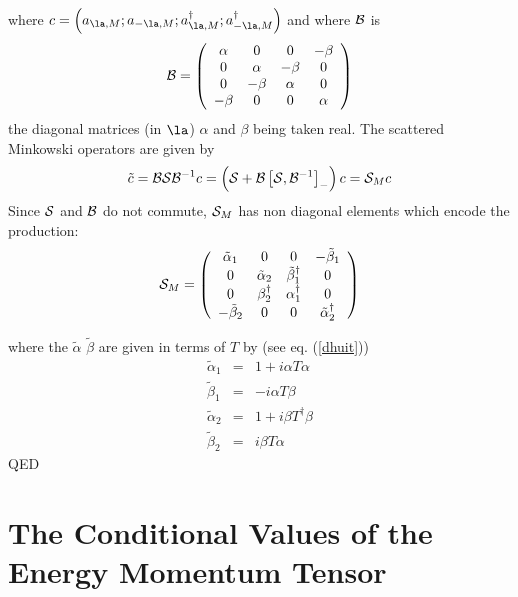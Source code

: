 where $c=  \left( a_{\la,M};a_{- \la,M};a_{\la,M}^\dagger;a_{- \la,M}^\dagger
\right)$
 and where $ {\cal  B}$ is
\begin{equation}
  {\cal  B} =
\left( \begin{array}{cccc}
 \alpha &  0 & 0 & - \beta \\
 0 & \alpha & - \beta  & 0 \\
 0 & - \beta &\alpha & 0 \\
 - \beta  & 0 & 0 & \alpha \\
\end{array} \right)
\label{tthree}
\end{equation}
the diagonal matrices (in $\la$) $\alpha $ and $\beta$ being taken real.
The scattered Minkowski operators are given by
\begin{equation}
\tilde c =  {\cal  B}{ \cal  S}{ \cal  B }^{-1} c = \left(
{ \cal  S} + {\cal  B}\left[ { \cal
S},{ \cal  B }^{-1} \right]_- \right) c = {\cal  S}_M c
\label{tfour}
\end{equation}
Since  ${\cal  S}$ and  ${\cal  B}$ do not commute,  ${\cal  S}_M$ has non
diagonal elements which encode the production: \begin{equation}
  {\cal  S}_M  =
\left( \begin{array}{cccc}
 \tilde \alpha_1 &  0 & 0 & - \tilde \beta _1 \\
 0 & \tilde  \alpha_2 & \tilde  \beta^\dagger _1  & 0 \\
 0 &  \beta^\dagger_2 &\alpha _1^\dagger & 0 \\
 - \tilde  \beta_2  & 0 & 0 &\tilde  \alpha^\dagger_2 \\
\end{array} \right)
\label{tfive}
\end{equation}

where the $\tilde \alpha$ $\tilde \beta$ are given in terms of $T$ by
(see eq. (\ref{dhuit}))
\begin{eqnarray}
 \tilde  \alpha _1 &=&  1+i  \alpha T  \alpha
\nonumber\\
 \tilde
\beta _1  &=& -i  \alpha T \beta
\nonumber\\
\tilde  \alpha _2 &=& 1 +i \beta T^\dagger  \beta
\nonumber\\
\tilde
\beta_2 &=& i  \beta  T  \alpha
\label{tsix}
\end{eqnarray}
QED

\section{The Conditional Values of the Energy Momentum Tensor}

